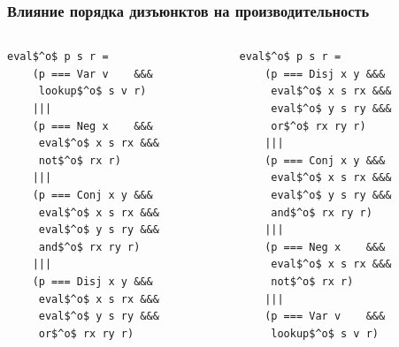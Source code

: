 \documentclass{beamer}
\begin{document}
\begin{frame}[fragile]
  \frametitle{Влияние порядка дизъюнктов на производительность}
\begin{columns}
  \begin{column}[]{0.5\textwidth}
    \begin{center}
      \begin{minipage}{4.3cm}
      \begin{lstlisting}[frame=single,backgroundcolor = \color{HappyGreen}]
  eval$^o$ p s r =
    (p === Var v    &&&
     lookup$^o$ s v r)
    |||
    (p === Neg x    &&&
     eval$^o$ x s rx &&&
     not$^o$ rx r)
    |||
    (p === Conj x y &&&
     eval$^o$ x s rx &&&
     eval$^o$ y s ry &&&
     and$^o$ rx ry r)
    |||
    (p === Disj x y &&&
     eval$^o$ x s rx &&&
     eval$^o$ y s ry &&&
     or$^o$ rx ry r)
      \end{lstlisting}
      \end{minipage}
  \end{center}
  \end{column}
  \begin{column}[]{0.5\textwidth}
    \begin{center}
      \begin{minipage}{4.3cm}
      \begin{lstlisting}[frame=single,backgroundcolor = \color{SadRed}]
  eval$^o$ p s r =
    (p === Disj x y &&&
     eval$^o$ x s rx &&&
     eval$^o$ y s ry &&&
     or$^o$ rx ry r)
    |||
    (p === Conj x y &&&
     eval$^o$ x s rx &&&
     eval$^o$ y s ry &&&
     and$^o$ rx ry r)
    |||
    (p === Neg x    &&&
     eval$^o$ x s rx &&&
     not$^o$ rx r)
    |||
    (p === Var v    &&&
     lookup$^o$ s v r)
      \end{lstlisting}
      \end{minipage}
  \end{center}

  \end{column}
\end{columns}
\end{frame}
\end{document}
